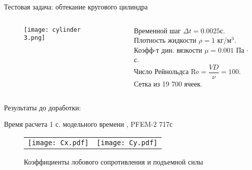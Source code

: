 \documentclass[9pt, ignoreonframetext,unicode]{beamer}
\begin{document}
\begin{frame}{Тестовая задача: обтекание кругового цилиндра}
	
	\vspace*{-9mm}
	\begin{columns}
		\begin{column}{0.5\textwidth}
	\begin{figure}[!h]
	\centering
	\texttt{[image: cylinder 3.png]}
	\label{picnaca}
\end{figure}
		\end{column}
		\begin{column}{0.5\textwidth}
	Временной шаг $\Delta t = 0.0025$с.\\
	Плотность жидкости $\rho = 1$ кг/м$^3$.\\
	Коэфф-т дин. вязкости $\mu = 0.001$ Па $\cdot$ с.\\
	Число Рейнольдса $\text{Re}=\dfrac{V D}{\nu} =100$.\\
	Сетка из 19 700 ячеек.
		\end{column}
	\end{columns}
\vspace*{-5mm}
\begin{center}
	Результаты до доработки:
\end{center}
Время расчета 1 с. модельного времени , \qquad PFEM-2 717с

\vspace*{-2mm}
				\begin{figure}[!h]
	\centering
	\begin{tabular}{cc}
		\texttt{[image: Cx.pdf]} & \texttt{[image: Cy.pdf]}\\
	\end{tabular}
	\caption{Коэффициенты лобового сопротивления и подъемной силы}
	\label{picCx0}
\end{figure}
\end{frame}
\end{document}
